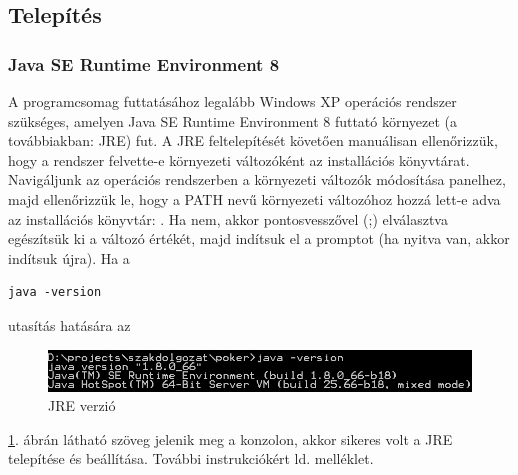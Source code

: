 \subsection{Telepítés}
\subsubsection{Java SE Runtime Environment 8}
A programcsomag futtatásához legalább Windows XP operációs rendszer szükséges, amelyen Java SE Runtime Environment 8 futtató környezet \cite{jresite} (a továbbiakban: JRE) fut. A JRE feltelepítését követően manuálisan ellenőrizzük, hogy a rendszer felvette-e környezeti változóként az installációs könyvtárat. Navigáljunk az operációs rendszerben a környezeti változók módosítása panelhez, majd ellenőrizzük le, hogy a PATH nevű környezeti változóhoz hozzá lett-e adva az installációs könyvtár: . 
Ha nem, akkor pontosvesszővel (;) elválasztva egészítsük ki a változó értékét, majd indítsuk el a promptot (ha nyitva van, akkor indítsuk újra).
Ha a
\begin{verbatim}
java -version
\end{verbatim}
utasítás hatására az 
\begin{figure}[h!]
  \caption{JRE verzió}
  \label{fig:jre_version}
  \centering
    \includegraphics{user-documentation/images/java_version.jpg}
\end{figure}
 \ref{fig:jre_version}. ábrán látható szöveg jelenik meg a konzolon, akkor sikeres volt a JRE telepítése és beállítása. További instrukciókért ld. melléklet.
 
